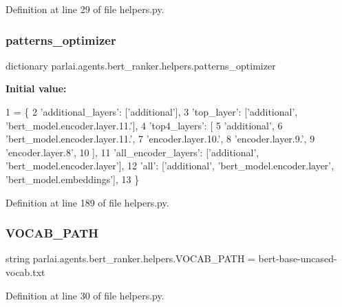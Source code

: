 Definition at line 29 of file helpers.\+py.

\mbox{\label{namespaceparlai_1_1agents_1_1bert__ranker_1_1helpers_aebda7127ff111489042a68edcd62830f}} 
\subsubsection{\texorpdfstring{patterns\+\_\+optimizer}{patterns\_optimizer}}
{\footnotesize\ttfamily dictionary parlai.\+agents.\+bert\+\_\+ranker.\+helpers.\+patterns\+\_\+optimizer}

{\bfseries Initial value\+:}
\begin{DoxyCode}
1 =  \{
2     \textcolor{stringliteral}{'additional\_layers'}: [\textcolor{stringliteral}{'additional'}],
3     \textcolor{stringliteral}{'top\_layer'}: [\textcolor{stringliteral}{'additional'}, \textcolor{stringliteral}{'bert\_model.encoder.layer.11.'}],
4     \textcolor{stringliteral}{'top4\_layers'}: [
5         \textcolor{stringliteral}{'additional'},
6         \textcolor{stringliteral}{'bert\_model.encoder.layer.11.'},
7         \textcolor{stringliteral}{'encoder.layer.10.'},
8         \textcolor{stringliteral}{'encoder.layer.9.'},
9         \textcolor{stringliteral}{'encoder.layer.8'},
10     ],
11     \textcolor{stringliteral}{'all\_encoder\_layers'}: [\textcolor{stringliteral}{'additional'}, \textcolor{stringliteral}{'bert\_model.encoder.layer'}],
12     \textcolor{stringliteral}{'all'}: [\textcolor{stringliteral}{'additional'}, \textcolor{stringliteral}{'bert\_model.encoder.layer'}, \textcolor{stringliteral}{'bert\_model.embeddings'}],
13 \}
\end{DoxyCode}


Definition at line 189 of file helpers.\+py.

\mbox{\label{namespaceparlai_1_1agents_1_1bert__ranker_1_1helpers_a88c47b25646aed4d2d140a159443bb7c}} 
\subsubsection{\texorpdfstring{V\+O\+C\+A\+B\+\_\+\+P\+A\+TH}{VOCAB\_PATH}}
{\footnotesize\ttfamily string parlai.\+agents.\+bert\+\_\+ranker.\+helpers.\+V\+O\+C\+A\+B\+\_\+\+P\+A\+TH = \textquotesingle{}bert-\/base-\/uncased-\/vocab.\+txt\textquotesingle{}}



Definition at line 30 of file helpers.\+py.

